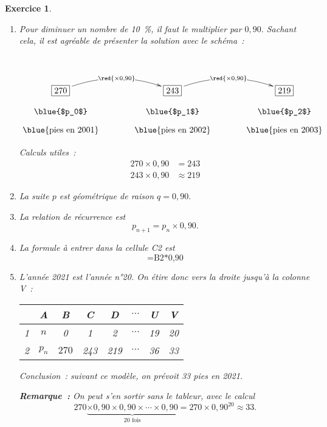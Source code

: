 \documentclass[10pt]{article}
\newtheorem{exo}{Exercice}
\begin{document}
\begin{exo}



\begin{enumerate}
\item Pour diminuer un nombre de 10~\%, il faut le multiplier par $0,90.$ Sachant cela, il est agréable de présenter la solution avec le schéma~:

\setlength{\columnseprule}{1pt}

\begin{multicols}{2}
~{}\begin{center}
    $\xymatrix@R=0.5pc@C=3pc{
    *+[F]+{270} \ar@/^0.5cm/[r]|{\red{\times 0,90}} & 
    *+[F]+{243} \ar@/^0.5cm/[r]|{\red{\times 0,90}} & *+[F]+{219} \\
    \txt{\blue{$p_0$}}&
    \txt{\blue{$p_1$}}&\txt{\blue{$p_2$}}\\
    \txt{\blue{pies en 2001}}&
    \txt{\blue{pies en 2002}}&\txt{\blue{pies en 2003}}
    }$
    \end{center}
    
  \columnbreak
  
  Calculs utiles~:
  \begin{align*}
  270\times 0,90&=243\\
  243\times 0,90&\approx 219
  \end{align*}
  
  \end{multicols}
    
    
\item La suite $p$ est géométrique de raison $q=0,90.$
\item La relation de récurrence est \[p_{n+1}=p_n\times 0,90.\]
\item La formule à entrer dans la cellule C2 est \[\text{=B2*0,90}\]
\item L'année 2021 est l'année n°20. On étire donc vers la droite jusqu'à la colonne V~:

\begin{center}
\begin{tabular}{|c|c|c|c|c|c|c|c|}
\hline
	& A	&B		&C		&D 		&$\cdots$&U	&V	\\\hline
1&$n$&0&1&2&$\cdots$&19&20\\\hline
2	& $p_n$&$270$&243&219&$\cdots$&36&33\\\hline
\end{tabular}
\end{center}


\medskip

Conclusion~: suivant ce modèle, on prévoit 33 pies en 2021.

\medskip

\textbf{Remarque~:} On peut s'en sortir sans le tableur, avec le calcul
\[270\underbrace{\times 0,90\times 0,90\times \cdots\times 0,90}_{\text{20 fois}}=270\times 0,90^{20}\approx 33.\]
\end{enumerate}
\end{exo}
\end{document}
